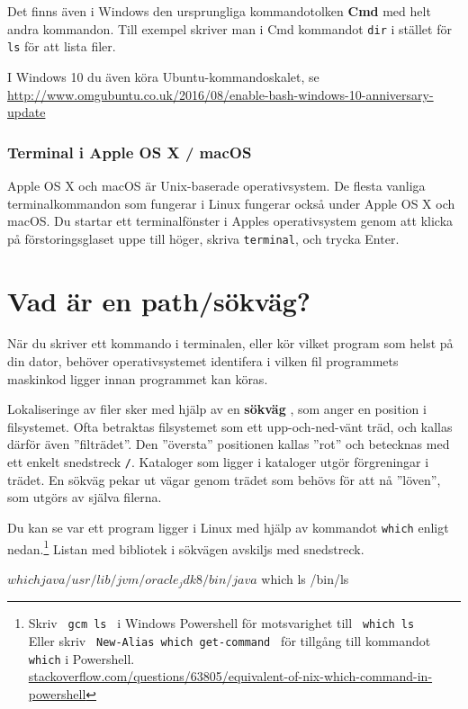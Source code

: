 Det finns även i Windows den ursprungliga kommandotolken \textbf{Cmd} med helt andra kommandon. Till exempel skriver man i Cmd kommandot \texttt{dir} i stället för \texttt{ls} för att lista filer. 

I Windows 10 du även köra Ubuntu-kommandoskalet, se\\ \href{http://www.omgubuntu.co.uk/2016/08/enable-bash-windows-10-anniversary-update}{http://www.omgubuntu.co.uk/2016/08/enable-bash-windows-10-anniversary-update}



\subsubsection{Terminal i Apple OS X / macOS}


Apple OS X och macOS är Unix-baserade operativsystem. De flesta vanliga terminalkommandon som fungerar i Linux fungerar också under Apple OS X och macOS. Du startar ett terminalfönster i Apples operativsystem genom att klicka på förstoringsglaset uppe till höger, skriva \texttt{terminal}, och trycka Enter.

\section{Vad är en path/sökväg?}\label{terminal:path}

När du skriver ett kommando i terminalen, eller kör vilket program som helst på din dator, behöver operativsystemet identifera i vilken fil programmets maskinkod ligger innan programmet kan köras. 

Lokaliseringe av filer sker med hjälp av en \textbf{sökväg} , som anger en position i filsystemet. Ofta betraktas filsystemet som ett upp-och-ned-vänt träd, och kallas därför även ''filträdet''. Den ''översta'' positionen kallas ''rot''  och betecknas med ett enkelt snedstreck \texttt{/}. Kataloger som ligger i kataloger utgör förgreningar i trädet. En sökväg pekar ut vägar genom trädet som behövs för att nå ''löven'', som utgörs av själva filerna.

Du kan se var ett program ligger i Linux med hjälp av kommandot \texttt{which} enligt nedan.\footnote{Skriv \texttt{ gcm ls } i Windows Powershell för motsvarighet till \texttt{ which ls } \\ Eller skriv \texttt{ New-Alias which get-command } för tillgång till kommandot \texttt{which} i Powershell. \\ \href{http://stackoverflow.com/questions/63805/equivalent-of-nix-which-command-in-powershell}{stackoverflow.com/questions/63805/equivalent-of-nix-which-command-in-powershell}} Listan med bibliotek i sökvägen avskiljs med snedstreck.
\begin{REPLnonum}
$ which java
/usr/lib/jvm/oracle_jdk8/bin/java
$ which ls
/bin/ls
\end{REPLnonum}

